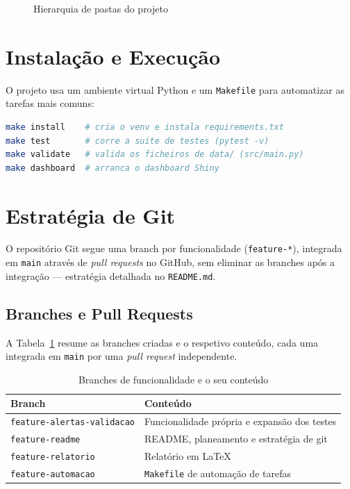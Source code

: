\documentclass[11pt,a4paper]{report}
\begin{document}
\begin{figure}[H]\centering
{}
\caption{Hierarquia de pastas do projeto}\label{fig:arvore}
\end{figure}

\section{Instalação e Execução}

O projeto usa um ambiente virtual Python e um \texttt{Makefile} para
automatizar as tarefas mais comuns:

\begin{lstlisting}[language=bash,caption={Automação de tarefas (\texttt{Makefile})},label=lst:makefile]
make install    # cria o venv e instala requirements.txt
make test       # corre a suite de testes (pytest -v)
make validate   # valida os ficheiros de data/ (src/main.py)
make dashboard  # arranca o dashboard Shiny
\end{lstlisting}

\section{Estratégia de Git}

O repositório Git segue uma branch por funcionalidade (\texttt{feature-*}),
integrada em \texttt{main} através de \textit{pull requests} no GitHub, sem
eliminar as branches após a integração --- estratégia detalhada no
\texttt{README.md}.

\subsection{Branches e Pull Requests}

A Tabela~\ref{tab:branches} resume as branches criadas e o respetivo
conteúdo, cada uma integrada em \texttt{main} por uma \textit{pull request}
independente.

\begin{table}[H]\centering
  \begin{tabular}{ll}
    \textbf{Branch} & \textbf{Conteúdo} \\ \hline
    \texttt{feature-alertas-validacao} & Funcionalidade própria e expansão dos testes \\
    \texttt{feature-readme}            & README, planeamento e estratégia de git \\
    \texttt{feature-relatorio}         & Relatório em LaTeX \\
    \texttt{feature-automacao}         & \texttt{Makefile} de automação de tarefas \\
  \end{tabular}
  \caption{Branches de funcionalidade e o seu conteúdo}\label{tab:branches}
\end{table}
\end{document}

